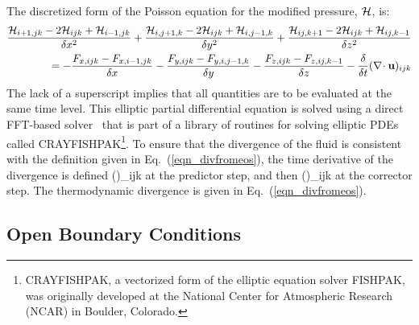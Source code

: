 The discretized form of the
Poisson equation for the modified pressure, $\mathcal{H}$, is:
\begin{align}
\frac{\mathcal{H}_{i+1,jk}-2\mathcal{H}_{ijk}+\mathcal{H}_{i-1,jk}}{\delta x^2} +
\frac{\mathcal{H}_{i,j+1,k}-2\mathcal{H}_{ijk}+\mathcal{H}_{i,j-1,k}}{\delta y^2} +
\frac{\mathcal{H}_{ij,k+1}-2\mathcal{H}_{ijk}+\mathcal{H}_{ij,k-1}}{\delta z^2} \notag \\ =
    -\frac{F_{x,ijk} - F_{x,i-1,jk}}{\delta x}
    -\frac{F_{y,ijk} - F_{y,i,j-1,k}}{\delta y}
    -\frac{F_{z,ijk} - F_{z,ij,k-1}}{\delta z} - \frac{\delta}{\delta t}(\nabla\!\cdot {\mathbf{u}})_{ijk}
\end{align}
The lack of a superscript implies that all quantities are to be
evaluated at the same time level.
This elliptic partial differential equation is solved using a direct
FFT-based solver~\cite{Sweet:1} that is part of a library of routines
for solving elliptic PDEs called CRAYFISHPAK\footnote{CRAYFISHPAK, a vectorized form of the
elliptic equation solver FISHPAK, was originally developed at the National Center for Atmospheric
Research (NCAR) in Boulder, Colorado.}.
To ensure that the divergence of the fluid is consistent with the definition
given in Eq.~(\ref{eqn_divfromeos}), the time derivative of the divergence is defined
\be {}(\nabla\!\cdot \bu)_{ijk} \equiv
           \ee
at the predictor step, and then
\be {}(\nabla\!\cdot \bu)_{ijk} \equiv
          \ee
at the corrector step. The thermodynamic divergence is
given in Eq.~(\ref{eqn_divfromeos}).


\subsection{Open Boundary Conditions}

